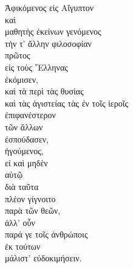 {\large
\noindent Ἀφικόμενος εἰς Αἴγυπτον\\
καὶ \\
μαθητὴς ἐκείνων γενόμενος \\
τήν τ' ἄλλην φιλοσοφίαν \\
\tabto{2em} πρῶτος \\
\tabto{4em} εἰς τοὺς ῞Ελληνας \\
\tabto{2em} ἐκόμισεν,\\
καὶ τὰ περὶ τὰς θυσίας \\
καὶ τὰς ἁγιστείας τὰς ἐν τοῖς ἱεροῖς \\
ἐπιφανέστερον \\
\tabto{2em} τῶν ἄλλων \\
ἐσπούδασεν,\\
ἡγούμενος, \\
\tabto{2em} εἰ καὶ μηδὲν \\
\tabto{2em} αὐτῷ \\
\tabto{4em} διὰ ταῦτα \\
\tabto{2em} πλέον γίγνοιτο \\
\tabto{4em} παρὰ τῶν θεῶν, \\
\tabto{2em} ἀλλ' οὖν \\
\tabto{4em} παρά γε τοῖς ἀνθρώποις \\
\tabto{4em} ἐκ τούτων \\
\tabto{2em} μάλιστ' εὐδοκιμήσειν.

}


